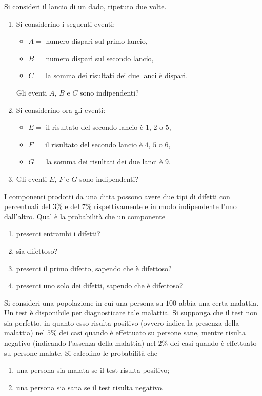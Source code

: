 Si consideri il lancio di un dado, ripetuto due volte.
\begin{enumerate}
\item Si considerino i seguenti eventi:
\begin{itemize}
\item $A=$ numero dispari sul primo lancio,
\item $B=$ numero dispari sul secondo lancio,
\item $C=$ la somma dei risultati dei due lanci è dispari.
\end{itemize}

Gli eventi $A$, $B$ e $C$ sono indipendenti?
\item Si considerino ora gli eventi:
\begin{itemize}
\item $E=$ il risultato del secondo lancio è $1$, $2$ o $5$,
\item $F=$ il risultato del secondo lancio è $4$, $5$ o $6$,
\item $G=$ la somma dei risultati dei due lanci è $9$.
\end{itemize}
\item Gli eventi $E$, $F$ e $G$ sono indipendenti?
\end{enumerate}
\Esercizio{}

I componenti prodotti da una ditta possono avere due tipi di difetti con percentuali del $3\%$ e del $7\%$ rispettivamente e in modo indipendente l'uno dall'altro. Qual è la probabilità che un componente
\begin{enumerate}
\item presenti entrambi i difetti?
\item sia difettoso?
\item presenti il primo difetto, sapendo che è difettoso?
\item presenti uno solo dei difetti, sapendo che è difettoso?
\end{enumerate}
\Esercizio{}

Si consideri una popolazione in cui una persona su $100$ abbia una certa malattia. Un test è disponibile per diagnosticare tale malattia. Si supponga che il test non sia perfetto, in quanto esso risulta positivo (ovvero indica la presenza della malattia) nel $5\%$ dei casi quando è effettuato su persone sane, mentre risulta negativo (indicando l'assenza della malattia) nel $2\%$ dei casi quando è effettuato su persone malate. Si calcolino le probabilità che
\begin{enumerate}
\item una persona sia malata se il test risulta positivo;
\item una persona sia sana se il test risulta negativo.
\end{enumerate}
\Esercizio{}

